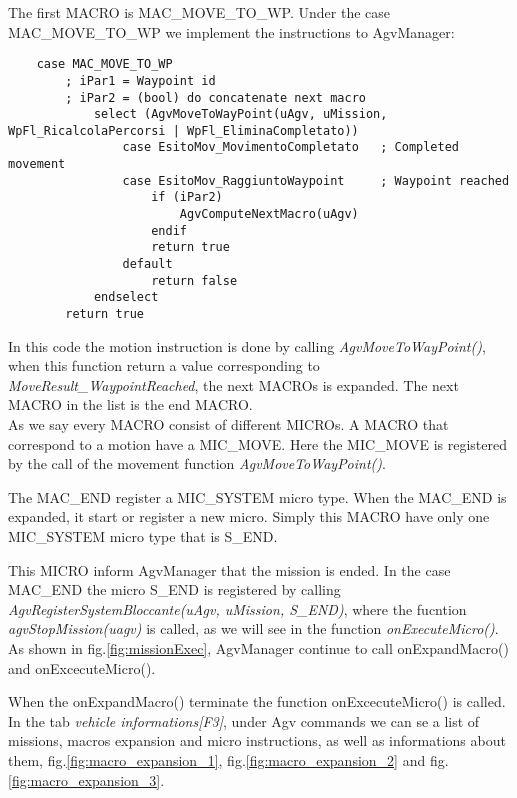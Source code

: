 The first MACRO is MAC\_MOVE\_TO\_WP. Under the case MAC\_MOVE\_TO\_WP we implement the instructions to AgvManager:

\begin{lstlisting}
	case MAC_MOVE_TO_WP
		; iPar1 = Waypoint id
		; iPar2 = (bool) do concatenate next macro
			select (AgvMoveToWayPoint(uAgv, uMission, WpFl_RicalcolaPercorsi | WpFl_EliminaCompletato))
				case EsitoMov_MovimentoCompletato	; Completed movement
				case EsitoMov_RaggiuntoWaypoint		; Waypoint reached
					if (iPar2)
						AgvComputeNextMacro(uAgv)
					endif
					return true
				default
					return false
			endselect
		return true
\end{lstlisting}

In this code the motion instruction is done by calling \textit{AgvMoveToWayPoint()}, when this function return a value corresponding to \textit{MoveResult\_WaypointReached}, the next MACROs is expanded. The next MACRO in the list is the end MACRO.\\

As we say every MACRO consist of different MICROs. A MACRO that correspond to a motion have a MIC\_MOVE. Here the MIC\_MOVE is registered by the call of the movement function \textit{AgvMoveToWayPoint()}.

The MAC\_END register a MIC\_SYSTEM micro type. When the MAC\_END is expanded, it start or register a new micro. Simply this MACRO have only one MIC\_SYSTEM micro type that is S\_END.

This MICRO inform AgvManager that the mission is ended. In the case MAC\_END the micro S\_END is registered by calling \textit{AgvRegisterSystemBloccante(uAgv, uMission, S\_END)}, where the fucntion \textit{agvStopMission(uagv)} is called, as we will see in the function \textit{onExecuteMicro()}.\\

As shown in fig.\ref{fig:missionExec}, AgvManager continue to call onExpandMacro() and onExcecuteMicro().

When the onExpandMacro() terminate the function onExcecuteMicro() is called.\\

In the tab \textit{vehicle informations[F3]}, under Agv commands we can se a list of missions, macros expansion and micro instructions, as well as informations about them, fig.\ref{fig:macro_expansion_1}, fig.\ref{fig:macro_expansion_2} and fig.\ref{fig:macro_expansion_3}.\\

